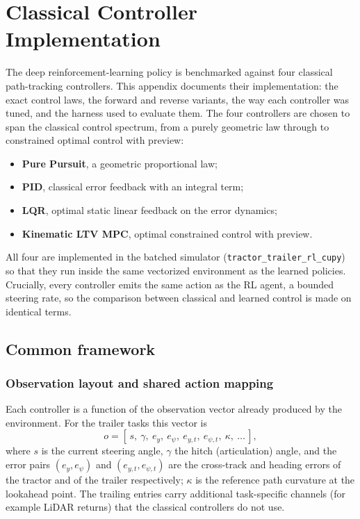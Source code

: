 \chapter{Classical Controller Implementation}
\label{app:classical_controllers}

The deep reinforcement-learning policy is benchmarked against four classical
path-tracking controllers. This appendix documents their implementation: the exact
control laws, the forward and reverse variants, the way each controller was tuned, and
the harness used to evaluate them. The four controllers are chosen to span the classical
control spectrum, from a purely geometric law through to constrained optimal control with
preview:

\begin{itemize}
    \item \textbf{Pure Pursuit}, a geometric proportional law;
    \item \textbf{PID}, classical error feedback with an integral term;
    \item \textbf{LQR}, optimal static linear feedback on the error dynamics;
    \item \textbf{Kinematic LTV MPC}, optimal constrained control with preview.
\end{itemize}

All four are implemented in the batched simulator
(\texttt{tractor\_trailer\_rl\_cupy}) so that they run inside the same vectorized
environment as the learned policies. Crucially, every controller emits the same action
as the RL agent, a bounded steering rate, so the comparison between
classical and learned control is made on identical terms.

\section{Common framework}
\label{sec:app_cc_common}

\subsection{Observation layout and shared action mapping}

Each controller is a function of the observation vector already produced by the
environment. For the trailer tasks this vector is
\begin{equation}
    o = [\,s,\ \gamma,\ e_y,\ e_\psi,\ e_{y,t},\ e_{\psi,t},\ \kappa,\ \dots\,],
    \label{eq:app_cc_obs}
\end{equation}
where $s$ is the current steering angle, $\gamma$ the hitch (articulation) angle, and the
error pairs $(e_y, e_\psi)$ and $(e_{y,t}, e_{\psi,t})$ are the cross-track and heading
errors of the tractor and of the trailer respectively; $\kappa$ is the reference path
curvature at the lookahead point. The trailing entries carry additional task-specific
channels (for example LiDAR returns) that the classical controllers do not use.

